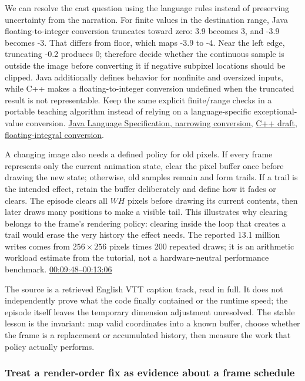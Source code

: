 We can resolve the cast question using the language rules instead of preserving uncertainty from the narration. For finite values in the destination range, Java floating-to-integer conversion truncates toward zero: 3.9 becomes 3, and -3.9 becomes -3. That differs from floor, which maps -3.9 to -4. Near the left edge, truncating -0.2 produces 0; therefore decide whether the continuous sample is outside the image before converting it if negative subpixel locations should be clipped. Java additionally defines behavior for nonfinite and oversized inputs, while C++ makes a floating-to-integer conversion undefined when the truncated result is not representable. Keep the same explicit finite/range checks in a portable teaching algorithm instead of relying on a language-specific exceptional-value conversion. \href{https://docs.oracle.com/javase/specs/jls/se21/html/jls-5.html\#jls-5.1.3}{Java Language Specification, narrowing conversion}, \href{https://eel.is/c++draft/conv.fpint}{C++ draft, floating-integral conversion}.

A changing image also needs a defined policy for old pixels. If every frame represents only the current animation state, clear the pixel buffer once before drawing the new state; otherwise, old samples remain and form trails. If a trail is the intended effect, retain the buffer deliberately and define how it fades or clears. The episode clears all \(WH\) pixels before drawing its current contents, then later draws many positions to make a visible tail. This illustrates why clearing belongs to the frame's rendering policy: clearing inside the loop that creates a trail would erase the very history the effect needs. The reported 13.1 million writes comes from \(256\times256\) pixels times 200 repeated draws; it is an arithmetic workload estimate from the tutorial, not a hardware-neutral performance benchmark. \href{https://www.youtube.com/watch?v=dwn_UrItwfw&t=588s}{00:09:48--00:13:06}

The source is a retrieved English VTT caption track, read in full. It does not independently prove what the code finally contained or the runtime speed; the episode itself leaves the temporary dimension adjustment unresolved. The stable lesson is the invariant: map valid coordinates into a known buffer, choose whether the frame is a replacement or accumulated history, then measure the work that policy actually performs.

\subsubsection{Treat a render-order fix as evidence about a frame schedule}\label{treat-a-render-order-fix-as-evidence-about-a-frame-schedule}

